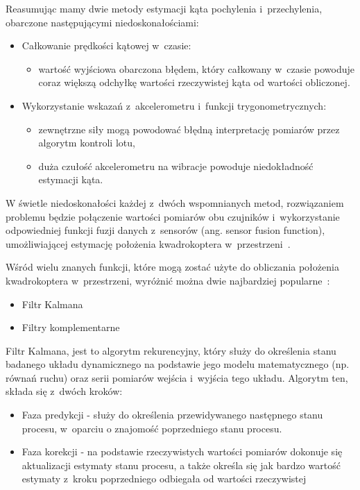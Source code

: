 Reasumując mamy dwie metody estymacji kąta pochylenia i~przechylenia, obarczone następującymi niedoskonałościami:

\begin{itemize}
	\item Całkowanie prędkości kątowej w~czasie:
		\begin{itemize}
			\item wartość wyjściowa obarczona błędem, który całkowany w~czasie powoduje coraz większą odchyłkę wartości rzeczywistej kąta od wartości obliczonej.
		\end{itemize}
	\item Wykorzystanie wskazań z~akcelerometru i~funkcji trygonometrycznych:
		\begin{itemize}
			\item zewnętrzne siły mogą powodować błędną interpretację pomiarów przez algorytm kontroli lotu,
			\item duża czułość akcelerometru na wibracje powoduje niedokładność estymacji kąta.
		\end{itemize}
\end{itemize}

W świetle niedoskonałości każdej z~dwóch wspomnianych metod, rozwiązaniem problemu będzie połączenie wartości pomiarów obu czujników i~wykorzystanie odpowiedniej funkcji fuzji danych z~sensorów (ang. sensor fusion function), umożliwiającej estymację położenia kwadrokoptera w~przestrzeni~\cite{filters1}.

Wśród wielu znanych funkcji, które mogą zostać użyte do obliczania położenia kwadrokoptera w~przestrzeni, wyróżnić można dwie najbardziej popularne~\cite{filters1, filters2, filters3}:
\begin{itemize}
	\item Filtr Kalmana
	\item Filtry komplementarne
\end{itemize}

Filtr Kalmana, jest to algorytm rekurencyjny, który służy do określenia stanu badanego układu dynamicznego na podstawie jego modelu matematycznego (np. równań ruchu) oraz serii pomiarów wejścia i~wyjścia tego układu. Algorytm ten, składa się z~dwóch kroków:

\begin{itemize}
	\item Faza predykcji - służy do określenia przewidywanego następnego stanu procesu, w~oparciu o znajomość poprzedniego stanu procesu.
	\item Faza korekcji - na podstawie rzeczywistych wartości pomiarów dokonuje się aktualizacji estymaty stanu procesu, a także określa się jak bardzo wartość estymaty z~kroku poprzedniego odbiegała od wartości rzeczywistej
\end{itemize} 

